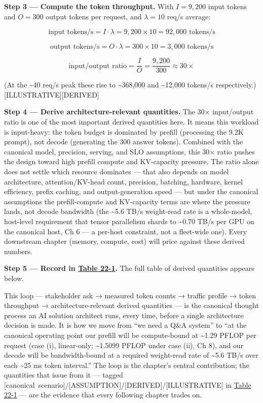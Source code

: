 \textbf{Step 3 --- Compute the token throughput.} With \(I = 9{,}200\)
input tokens and \(O = 300\) output tokens per request, and
\(\lambda = 10\) req/s average:

\[
\text{input tokens/s} = I \cdot \lambda = 9{,}200 \times 10 = 92{,}000 \text{ tokens/s}
\]

\[
\text{output tokens/s} = O \cdot \lambda = 300 \times 10 = 3{,}000 \text{ tokens/s}
\]

\[
\text{input/output ratio} = \frac{I}{O} = \frac{9{,}200}{300} \approx 30\times
\]

(At the \textasciitilde40 req/s peak these rise to
\textasciitilde368,000 and \textasciitilde12,000 tokens/s respectively.)
\mbox{{[}ILLUSTRATIVE{]}}\hspace{0pt}\mbox{{[}DERIVED{]}}

\textbf{Step 4 --- Derive architecture-relevant quantities.} The 30×
input/output ratio is one of the most important derived quantities here.
It means this workload is input-heavy: the token budget is dominated by
prefill (processing the 9.2K prompt), not decode (generating the 300
answer tokens). Combined with the canonical model, precision, serving,
and SLO assumptions, this 30× ratio pushes the design toward high
prefill compute and KV-capacity pressure. The ratio alone does not
settle which resource dominates --- that also depends on model
architecture, attention/KV-head count, precision, batching, hardware,
kernel efficiency, prefix caching, and output-generation speed --- but
under the canonical assumptions the prefill-compute and KV-capacity
terms are where the pressure lands, not decode bandwidth (the
\textasciitilde5.6 TB/s weight-read rate is a whole-model, host-level
requirement that tensor parallelism shards to \textasciitilde0.70 TB/s
per GPU on the canonical host, Ch 6 --- a per-host constraint, not a
fleet-wide one). Every downstream chapter (memory, compute, cost) will
price against these derived numbers.

\textbf{Step 5 --- Record in \hyperref[tab:22.1]{Table 22-1}.} The full table of derived
quantities appears below.

This loop --- stakeholder ask → measured token counts → traffic profile
→ token throughput → architecture-relevant derived quantities --- is the
canonical thought process an AI solution architect runs, every time,
before a single architecture decision is made. It is how we move from
``we need a Q\&A system'' to ``at the canonical operating point our
prefill will be compute-bound at \textasciitilde1.29 PFLOP per request
(case (i), linear-only; \textasciitilde1.5099 PFLOP under case (ii), Ch
8), and our decode will be bandwidth-bound at a required weight-read
rate of \textasciitilde5.6 TB/s over each \textasciitilde25 ms token
interval.'' The loop is the chapter's central contribution; the
quantities that issue from it --- tagged \mbox{{[}canonical
scenario{]}}/\mbox{{[}ASSUMPTION{]}}/\mbox{{[}DERIVED{]}}/\mbox{{[}ILLUSTRATIVE{]}} in \hyperref[tab:22.1]{Table 22-1} --- are the evidence that every following chapter trades on.

